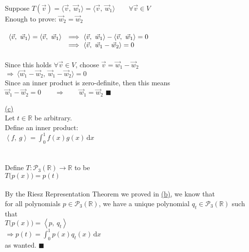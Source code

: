 \documentclass[12pt]{article}
\newcommand{\R}{\mathbb{R}}
\newcommand{\innerproduct}[2]{\left\langle #1, \ #2\right\rangle}
\renewcommand{\qed}{\hfill$\blacksquare$}
\begin{document}
Suppose $T(\vec{v}) = \langle \vec{v}, \ \vec{w}_1 \rangle = \langle \vec{v}, \ \vec{w}_1 \rangle \qquad \forall \vec{v} \in V$\\
Enough to prove: $\vec{w}_2 = \vec{w}_2$
\\\\
{$\begin{array}{r>{\displaystyle}l}
		\langle \vec{v}, \ \vec{w}_1 \rangle = \langle \vec{v}, \ \vec{w}_1 \rangle & \Longrightarrow\ \langle \vec{v}, \ \vec{w}_1 \rangle - \langle \vec{v}, \ \vec{w}_1 \rangle = 0 \\
		                                                                            & \Longrightarrow\ \langle \vec{v}, \ \vec{w}_1 -\vec{w}_2\rangle = 0                              \\
	\end{array}$}
\\\\
Since this holds $\forall \vec{v} \in V$, choose $\vec{v} = \vec{w}_1 -\vec{w}_2$\\
$\Longrightarrow\ \langle \vec{w}_1 -\vec{w}_2, \ \vec{w}_1 -\vec{w}_2\rangle = 0$\\
Since an inner product is zero-definite, then this means\\
$\vec{w}_1 -\vec{w}_2 = 0 \qquad \Longrightarrow\qquad \vec{w}_1 =\vec{w}_2$ \qed\newpage




\hyperlink{toc}{\hypertarget{4.3}{(c)}}\\
Let $t \in \R$ be arbitrary.\\
Define an inner product:\\
$\innerproduct{f}{g} = \displaystyle \int_{0}^{1}  f(x)g(x)\,\mathrm{d}x$
\\\\\\
Define $T:\mathcal{P}_3(\R) \rightarrow \R$ to be \vspace*{1mm}\\
$T\big(p(x)\big)= p(t)$
\\\\
By the Riesz Representation Theorem we proved in \hyperlink{4.2}{\hypertarget{4.2}{(b)}}, we know that \\
for all polynomials $p \in \mathcal{P}_3(\R)$, we have a unique polynomial $q_t \in \mathcal{P}_3(\R)$ such that \\
$T\big(p(x)\big) = \innerproduct{p}{q_t}$\\
$\Longrightarrow p(t) = \displaystyle \int_{0}^{1}  p(x)q_t(x)\,\mathrm{d}x$\\
as wanted. \qed
\\\\\\\\
\end{document}
